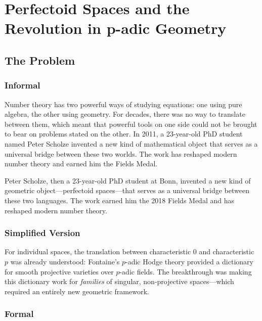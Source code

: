 \let\LocalMacro\relax

\chapter{Perfectoid Spaces and the Revolution in p-adic Geometry}

\section{The Problem}

\subsection{Informal}
Number theory has two powerful ways of studying equations: one using pure algebra, the other using geometry. For decades, there was no way to translate between them, which meant that powerful tools on one side could not be brought to bear on problems stated on the other. In 2011, a 23-year-old PhD student named Peter Scholze invented a new kind of mathematical object that serves as a universal bridge between these two worlds. The work has reshaped modern number theory and earned him the Fields Medal.

\begin{historicalbox}
Peter Scholze, then a 23-year-old PhD student at Bonn, invented a new kind of geometric object---perfectoid spaces---that serves as a universal bridge between these two languages. The work earned him the 2018 Fields Medal and has reshaped modern number theory.
\end{historicalbox}

\subsection{Simplified Version}
For individual spaces, the translation between characteristic 0 and characteristic $p$ was already understood: Fontaine's $p$-adic Hodge theory provided a dictionary for smooth projective varieties over $p$-adic fields. The breakthrough was making this dictionary work for \emph{families} of singular, non-projective spaces---which required an entirely new geometric framework.

\subsection{Formal}

